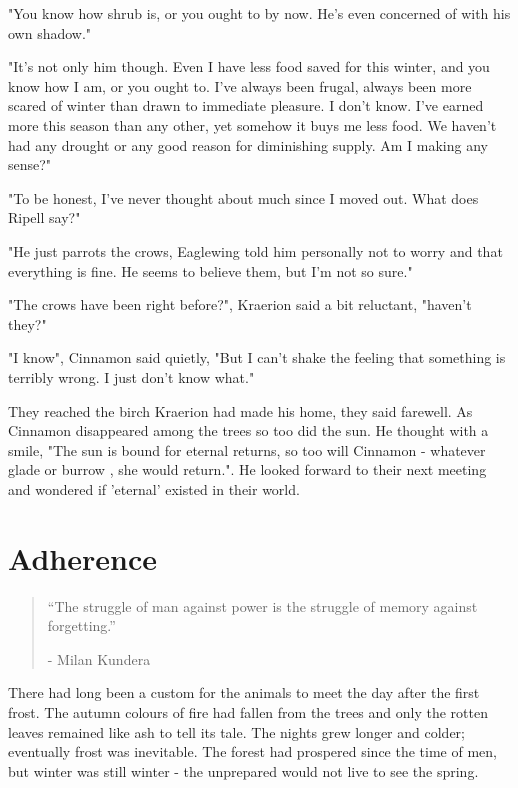 \documentclass[smalldemyvopaper,11pt,twoside,onecolumn,openright,extrafontsizes]{memoir}
\begin{document}
"You know how shrub is, or you ought to by now. He's even concerned of with his own shadow."

"It's not only him though. Even I have less food saved for this winter, and you know how I am, or you ought to. I've always been frugal, always been more scared of winter than drawn to immediate pleasure. I don't know. I've earned more this season than any other, yet somehow it buys me less food. We haven't had any drought or any good reason for diminishing supply. Am I making any sense?"

"To be honest, I've never thought about much since I moved out. What does Ripell say?"

"He just parrots the crows, Eaglewing told him personally not to worry and that everything is fine. He seems to believe them, but I'm not so sure."

"The crows have been right before?", Kraerion said a bit reluctant, "haven't they?"

"I know", Cinnamon said quietly, "But I can't shake the feeling that something is terribly wrong. I just don't know what."

They reached the birch Kraerion had made his home, they said farewell. As Cinnamon disappeared among the trees so too did the sun. He thought with a smile, "The sun is bound for eternal returns, so too will Cinnamon - whatever glade or burrow , she would return.". He looked forward to their next meeting and wondered if 'eternal' existed in their world.      

\chapter{Adherence}

\vspace{-1.3cm}
\begin{localsize}{10}
	\begin{quote}
		“The struggle of man against power is the struggle of memory against forgetting.”
		\begin{flushright}- Milan Kundera \end{flushright}
	\end{quote} 
\end{localsize}
\vspace{1cm}


There had long been a custom for the animals to meet the day after the first frost. The autumn colours of fire had fallen from the trees and only the rotten leaves remained like ash to tell its tale. The nights grew longer and colder; eventually frost was inevitable. The forest had prospered since the time of men, but winter was still winter - the unprepared would not live to see the spring. 
 
\end{document}
